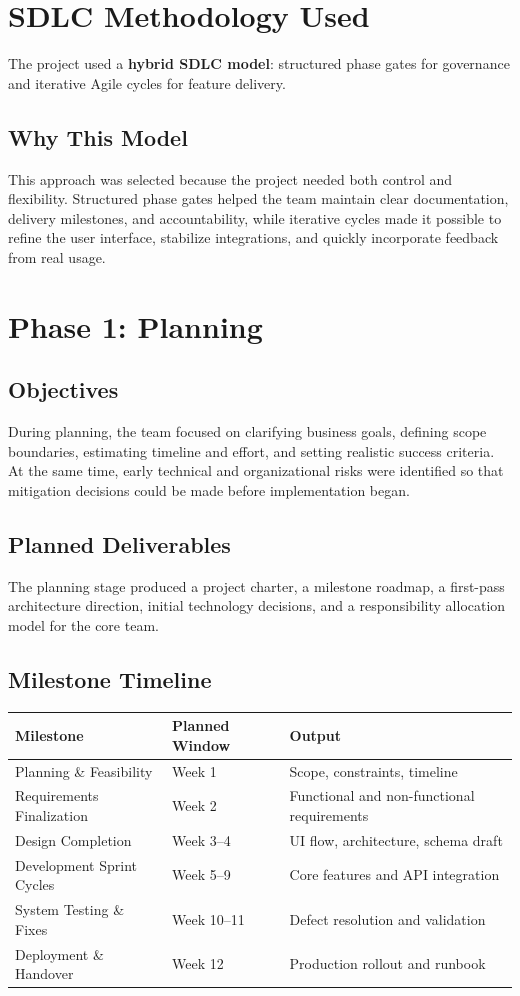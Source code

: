 \documentclass[12pt,a4paper]{article}
\begin{document}
\section{SDLC Methodology Used}
The project used a \textbf{hybrid SDLC model}: structured phase gates for governance and iterative Agile cycles for feature delivery.

\subsection{Why This Model}
This approach was selected because the project needed both control and flexibility. Structured phase gates helped the team maintain clear documentation, delivery milestones, and accountability, while iterative cycles made it possible to refine the user interface, stabilize integrations, and quickly incorporate feedback from real usage.

\section{Phase 1: Planning}
\subsection{Objectives}
During planning, the team focused on clarifying business goals, defining scope boundaries, estimating timeline and effort, and setting realistic success criteria. At the same time, early technical and organizational risks were identified so that mitigation decisions could be made before implementation began.

\subsection{Planned Deliverables}
The planning stage produced a project charter, a milestone roadmap, a first-pass architecture direction, initial technology decisions, and a responsibility allocation model for the core team.

\subsection{Milestone Timeline}
\begin{tabular}{p{} p{} p{}}
\toprule
\textbf{Milestone} & \textbf{Planned Window} & \textbf{Output} \\
\midrule
Planning \& Feasibility & Week 1 & Scope, constraints, timeline \\
Requirements Finalization & Week 2 & Functional and non-functional requirements \\
Design Completion & Week 3--4 & UI flow, architecture, schema draft \\
Development Sprint Cycles & Week 5--9 & Core features and API integration \\
System Testing \& Fixes & Week 10--11 & Defect resolution and validation \\
Deployment \& Handover & Week 12 & Production rollout and runbook \\
\bottomrule
\end{tabular}
\end{document}
